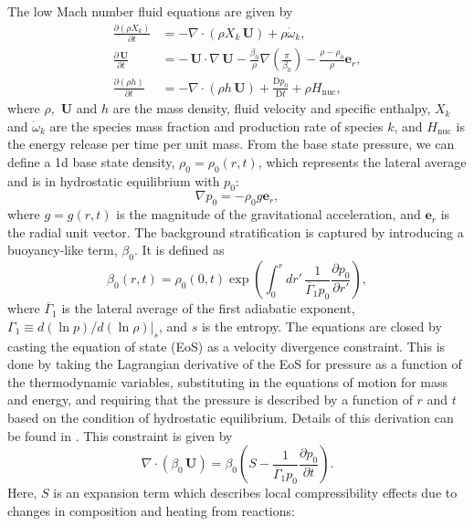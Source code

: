 \documentclass[a4paper]{jpconf}
\newcommand{\Ub}{{\,\bm{U}}}
\newcommand{\pd}[2]{\frac{\partial #1}{\partial #2}}
\newcommand{\md}[2]{\frac{\mathrm{D} #1}{\mathrm{D} #2}}
\begin{document}
The low Mach number fluid equations are given by 
\begin{align}
    \pd{\left(\rho X_k\right)}{t} &= - \nabla\cdot\left(\rho X_k \Ub \right) + \rho\dot{\omega}_k, \\
    \pd{\Ub}{t} &= - \Ub\cdot\nabla\Ub - \frac{\beta_0}{\rho}\nabla\left(\frac{\pi}{\beta_0}\right) - \frac{\rho - \rho_0}{\rho}\bm{e}_r,\\
    \pd{\left(\rho h\right)}{t} &= -\nabla\cdot\left(\rho h \Ub\right) + \md{p_0}{t} + \rho H_{\mathrm{nuc}},
\end{align}
where $\rho$, $\Ub$ and $h$ are the mass density, fluid velocity and specific enthalpy, $X_k$ and $\dot{\omega}_k$ are the species mass fraction and production rate of species $k$, and $H_{\mathrm{nuc}}$ is the energy release per time per unit mass. From the base state pressure, we can define a 1d base state density, $\rho_0 = \rho_0(r, t)$, which represents the lateral average and is in hydrostatic equilibrium with $p_0$:
\begin{equation}
    \nabla p_0 = -\rho_0 g \bm{e}_r,
\end{equation}
where $g = g(r,t)$ is the magnitude of the gravitational acceleration, and $\bm{e}_r$ is the radial unit vector. The background stratification is captured by introducing a buoyancy-like term, $\beta_0$. It is defined as 
\begin{equation}
    \beta_0(r,t) = \rho_0(0,t) \exp\left(\int_0^r dr'\, \frac{1}{\overline{\Gamma}_1p_0}\pd{p_0}{r'} \right),
\end{equation}
where $\overline{\Gamma}_1$ is the lateral average of the first adiabatic exponent, $\Gamma_1 \equiv d(\ln p)/d(\ln \rho)|_s$, and $s$ is the entropy. The equations are closed by casting the equation of state (EoS) as a velocity divergence constraint. This is done by taking the Lagrangian derivative of the EoS for pressure as a function of the thermodynamic variables, substituting in the equations of motion for mass and energy, and requiring that the pressure is described by a function of $r$ and $t$ based on the condition of hydrostatic equilibrium. Details of this derivation can be found in \cite{Almgren2006a,Almgren2006b}. This constraint is given by 
\begin{equation}
    \nabla\cdot\left(\beta_0\Ub\right) = \beta_0 \left(S - \frac{1}{\overline{\Gamma}_1 p_0}\pd{p_0}{t} \right).
\end{equation}
Here, $S$ is an expansion term which describes local compressibility effects due to changes in composition and heating from reactions:
\end{document}
